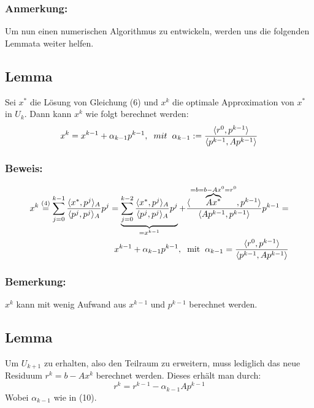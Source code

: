 \documentclass{article}
\begin{document}
\subsubsection{Anmerkung:}
Um nun einen numerischen Algorithmus zu entwickeln, werden uns die folgenden Lemmata weiter helfen.

\subsection{Lemma}
Sei $x^{*}$ die Lösung von Gleichung (6) und $x^{k}$ die optimale Approximation von $x^{*}$ in $U_{k}$. Dann kann $x^{k}$ wie folgt berechnet werden:
\begin{equation}
x^{k} = x^{k-1} + \alpha_{k-1}p^{k-1}, \hspace{2mm} mit \hspace{2mm} \alpha_{k-1} := \frac {\langle r^{0}, p^{k-1} \rangle} {\langle {p^{k-1}, Ap^{k-1}} \rangle}
\end{equation}

\subsubsection{Beweis:}
\begin{align*}
\begin{split}
x^{k} \overset{(4)}{=}
\sum_{j=0}^{k-1} \frac {\langle x^{*}, p^{j} \rangle _{A}} {\langle {p^{j}, p^{j}} \rangle _{A}} p^{j} =
\underbrace{\sum_{j=0}^{k-2} \frac {\langle x^{*}, p^{j} \rangle _{A}} {\langle {p^{j}, p^{j}} \rangle _{A}} p^{j}}_{=x^{k-1}} +
\frac {\langle \overbrace{Ax^{*}}^{=b=b-Ax^{0}=r^{0}}, p^{k-1} \rangle} {\langle {Ap^{k-1}, p^{k-1}} \rangle} p^{k-1} =\\
x^{k-1} + \alpha_{k-1}p^{k-1}, \hspace{2mm} \textnormal{mit} \hspace{2mm} \alpha_{k-1} = \frac {\langle r^{0}, p^{k-1} \rangle} {\langle {p^{k-1}, Ap^{k-1}} \rangle}
\end{split}
\end{align*}

\subsubsection{Bemerkung:}
$x^{k}$ kann mit wenig Aufwand aus $x^{k-1}$ und $p^{k-1}$ berechnet werden.

\subsection{Lemma}
Um $U_{k+1}$ zu erhalten, also den Teilraum zu erweitern, muss lediglich das neue Residuum $r^{k} = b - Ax^{k}$ berechnet werden. Dieses erhält man durch:
\begin{equation}
r^{k} = r^{k-1} - \alpha_{k-1}Ap^{k-1}
\end{equation}
Wobei $\alpha_{k-1}$ wie in (10).
\end{document}
